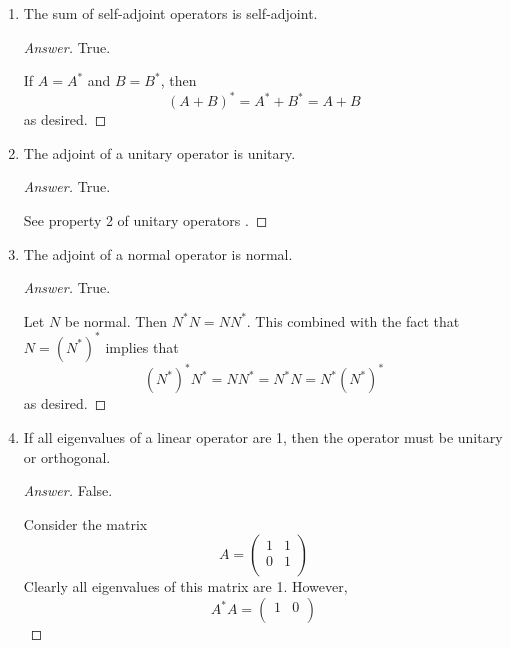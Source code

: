 \documentclass[../psets.tex]{subfiles}
\begin{document}
\begin{enumerate}[label={\textbf{2.\arabic*.}}]
\begin{enumerate}
\begin{proof}[Answer]
        \end{proof}
        \item The sum of self-adjoint operators is self-adjoint.
        \begin{proof}[Answer]
            True.\par
            If $A=A^*$ and $B=B^*$, then
            \begin{equation*}
                (A+B)^* = A^*+B^* = A+B
            \end{equation*}
            as desired.
        \end{proof}
        \item The adjoint of a unitary operator is unitary.
        \begin{proof}[Answer]
            True.\par
            See property 2 of unitary operators \parencite[148]{bib:Treil}.
        \end{proof}
        \item The adjoint of a normal operator is normal.
        \begin{proof}[Answer]
            True.\par
            Let $N$ be normal. Then $N^*N=NN^*$. This combined with the fact that $N=(N^*)^*$ implies that
            \begin{equation*}
                (N^*)^*N^* = NN^* = N^*N = N^*(N^*)^*
            \end{equation*}
            as desired.
        \end{proof}
        \item If all eigenvalues of a linear operator are 1, then the operator must be unitary or orthogonal.
        \begin{proof}[Answer]
            False.\par
            Consider the matrix
            \begin{equation*}
                A =
                \begin{pmatrix}
                    1 & 1\\
                    0 & 1\\
                \end{pmatrix}
            \end{equation*}
            Clearly all eigenvalues of this matrix are 1. However,
            \begin{equation*}
                A^*A =
                \begin{pmatrix}
                    1 & 0\\

\end{pmatrix}
\end{equation*}
\end{proof}
\end{enumerate}
\end{enumerate}
\end{document}
